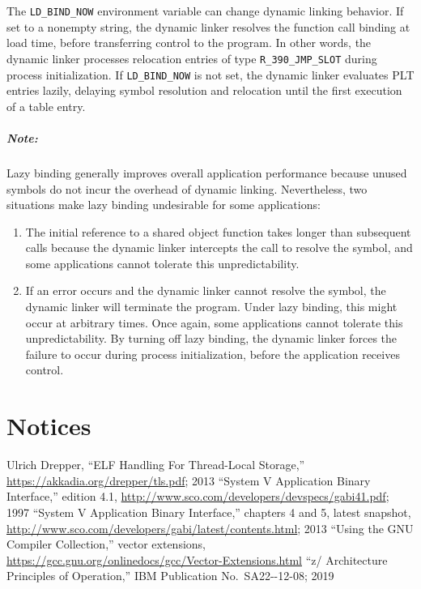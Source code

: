 \documentclass[english,11pt,twoside,toc=bib,toc=idx]{scrreprt}
\newcommand{\ARCH}{z/\kern-1pt Ar\-chi\-tec\-ture}
\newcommand{\ARCH}{ESA/390}
\begin{document}
The \texttt{LD\_BIND\_NOW} environment variable can change dynamic
linking behavior.  If set to a nonempty string, the dynamic linker
resolves the function call binding at load time, before transferring
control to the program.  In other words, the dynamic linker processes
relocation entries of type \texttt{R\_390\_JMP\_SLOT} during process
initialization.  If \texttt{LD\_BIND\_NOW} is not set, the dynamic
linker evaluates PLT entries lazily, delaying symbol resolution and
relocation until the first execution of a table entry.

\paragraph{Note:}
Lazy binding generally improves overall application performance
because unused symbols do not incur the overhead of dynamic
linking.  Nevertheless, two situations make lazy binding undesirable
for some applications:
\begin{enumerate}
\item The initial reference to a shared object function takes longer
  than subsequent calls because the dynamic linker intercepts the call
  to resolve the symbol, and some applications cannot tolerate this
  unpredictability.
\item If an error occurs and the dynamic linker cannot resolve the
  symbol, the dynamic linker will terminate the program.  Under lazy
  binding, this might occur at arbitrary times.  Once again, some
  applications cannot tolerate this unpredictability.  By turning off
  lazy binding, the dynamic linker forces the failure to occur during
  process initialization, before the application receives control.
\end{enumerate}

\appendix


\chapter{Notices}



\newcommand{\bibTitle}[1]{``#1''}

\begin{thebibliography}{9}
  Ulrich Drepper,
  \bibTitle{ELF Handling For Thread-Local Storage,}
  \url{https://akkadia.org/drepper/tls.pdf};
  2013
  \bibTitle{System V Application Binary Interface,}
  edition 4.1,
  \url{http://www.sco.com/developers/devspecs/gabi41.pdf};
  1997
  \bibTitle{System V Application Binary Interface,}
  chapters 4 and 5, latest snapshot,
  \url{http://www.sco.com/developers/gabi/latest/contents.html};
  2013
  \bibTitle{Using the GNU Compiler Collection,}
  vector extensions,
  \url{https://gcc.gnu.org/onlinedocs/gcc/Vector-Extensions.html}
  \bibTitle{\ARCH{} Principles of Operation,}
  IBM Publication No.~SA22-{-12-08\fi};
  2019
\end{thebibliography}

\printindex
\end{document}
